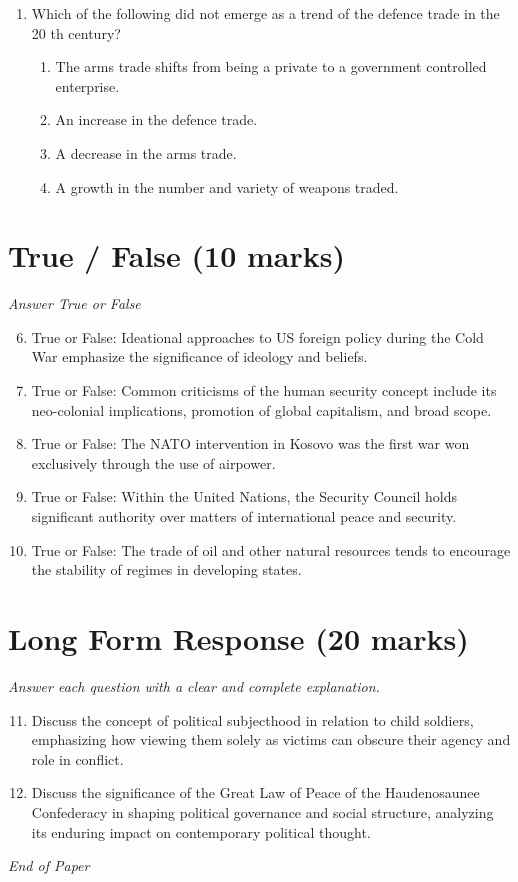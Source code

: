 \documentclass[12pt]{article}
\begin{document}
\begin{enumerate}[label=\arabic*.]
\begin{enumerate}[label=(\alph*)]
    \item 1990 s
    \item 1960 s
    \item 1980 s
\end{enumerate}
\item Which of the following did not emerge as a trend of the defence trade in the 20 th century?
\begin{enumerate}[label=(\alph*)]
    \item The arms trade shifts from being a private to a government controlled enterprise.
    \item An increase in the defence trade.
    \item A decrease in the arms trade.
    \item A growth in the number and variety of weapons traded.
\end{enumerate}
\end{enumerate}

\section*{True / False (10 marks)}
\textit{Answer True or False}
\begin{enumerate}[label=\arabic*.]
\setcounter{enumi}{5}
\item True or False: Ideational approaches to US foreign policy during the Cold War emphasize the significance of ideology and beliefs.
\item True or False: Common criticisms of the human security concept include its neo-colonial implications, promotion of global capitalism, and broad scope.
\item True or False: The NATO intervention in Kosovo was the first war won exclusively through the use of airpower.
\item True or False: Within the United Nations, the Security Council holds significant authority over matters of international peace and security.
\item True or False: The trade of oil and other natural resources tends to encourage the stability of regimes in developing states.
\end{enumerate}

\section*{Long Form Response (20 marks)}
\textit{Answer each question with a clear and complete explanation.}
\begin{enumerate}[label=\arabic*.]
\setcounter{enumi}{10}
\item Discuss the concept of political subjecthood in relation to child soldiers, emphasizing how viewing them solely as victims can obscure their agency and role in conflict.
\item Discuss the significance of the Great Law of Peace of the Haudenosaunee Confederacy in shaping political governance and social structure, analyzing its enduring impact on contemporary political thought.
\end{enumerate}

\vfill
\noindent\textit{End of Paper}
\end{document}
